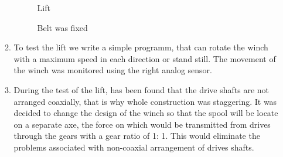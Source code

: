\begin{enumerate}
\begin{enumerate}
\begin{figure}[H]
\begin{minipage}[h]{0.27\linewidth}
      	\end{minipage}
      	\hfill
      	\begin{minipage}[h]{0.27\linewidth}
      	\end{minipage}
      	\vfill
      	\begin{minipage}[h]{0.4\linewidth}
      		\caption{Lift}
      	\end{minipage}
      	\hfill
      	\begin{minipage}[h]{0.58\linewidth}
      		\caption{Belt was fixed}
      	\end{minipage}
      \end{figure}
      
      \item	To test the lift we write a simple programm, that can rotate the winch with a maximum speed in each direction or stand still. The movement of the winch was monitored using the right analog sensor.
      
      \item	During the test of the lift, has been found that the drive shafts are not arranged coaxially, that is why whole construction was staggering. It was decided to change the design of the winch so that the spool will be locate on a separate axe, the force on which would be transmitted from drives through the gears with a gear ratio of 1: 1. This would eliminate the problems associated with non-coaxial arrangement of drives shafts.
      

\end{enumerate}
\end{enumerate}
